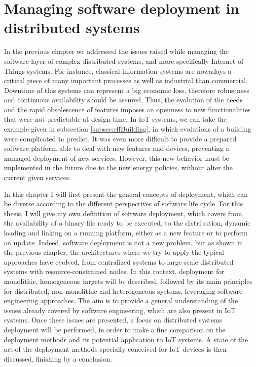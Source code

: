 \chapter{Managing software deployment in distributed systems}
\label{ch:managingDS}
In the previous chapter we addressed the issues raised while managing the software layer of complex distributed systems, and more specifically Internet of Things systems.
For instance, classical information systems are nowadays a critical piece of many important processes as well as industrial than commercial.
Downtime of this systems can represent a big economic loss, therefore robustness and continuous availability should be assured.
Thus, the evolution of the needs and the rapid obsolescence of features imposes an openness to new functionalities that were not predictable at design time.
In IoT systems, we can take the example given in subsection \ref{subsec:effBuilding}, in which evolutions of a building were complicated to predict.
It was even more difficult to provide a prepared software platform able to deal with new features and devices, preventing a managed deployment of new services.
However, this new behavior must be implemented in the future due to the new energy policies, without alter the current given services.

In this chapter I will first present the general concepts of deployment, which can be diverse according to the different perspectives of software life cycle.
For this thesis, I will give my own definition of software deployment, which covers from the availability of a binary file ready to be executed, to the distribution, dynamic loading and linking on a running platform, either as a new feature or to perform an update.
Indeed, software deployment is not a new problem, but as shown in the previous chapter, the architectures where we try to apply the typical approaches have evolved, from centralized systems to large-scale distributed systems with resource-constrained nodes.
In this context, deployment for monolithic, homogeneous targets will be described, followed by its main principles for distributed, non-monolithic and heterogeneous systems, leveraging software engineering approaches.
The aim is to provide a general understanding of the issues already covered by software engineering, which are also present in IoT systems.
Once these issues are presented, a focus on distributed systems deployment will be performed, in order to make a fine comparison on the deployment methods and its potential application to IoT systems.
A state of the art of the deployment methods specially conceived for IoT devices is then discussed, finishing by a conclusion.

